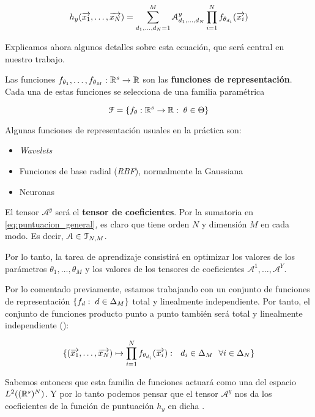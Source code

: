 \begin{equation} \label{eq:puntuacion_general}
    h_y(\overrightarrow{x_1}, \ldots, \overrightarrow{x_N}) = \sum_{d_1, \ldots, d_N = 1}^{M} \mathcal{A}^y_{d_1, \ldots, d_N} \prod_{i = 1}^N f_{\theta_{d_i}}(\overrightarrow{x_i})
\end{equation}

Explicamos ahora algunos detalles sobre esta ecuación, que será central en nuestro trabajo.

Las funciones $f_{\theta_1}, \ldots, f_{\theta_M}: \mathbb{R}^s \to \mathbb{R}$ son las \textbf{funciones de representación}. Cada una de estas funciones se selecciona de una familia paramétrica

$$\mathcal{F} = \{ f_{\theta}: \mathbb{R}^s \to \mathbb{R}: \; \theta \in \Theta \}$$

Algunas funciones de representación usuales en la práctica son:

\begin{itemize}
    \item \textit{Wavelets}
    \item Funciones de base radial (\textit{RBF}), normalmente la Gaussiana
    \item Neuronas
\end{itemize}

El tensor $\mathcal{A}^y$ será el \textbf{tensor de coeficientes}. Por la sumatoria en \eqref{eq:puntuacion_general}, es claro que tiene orden $N$ y dimensión $M$ en cada modo. Es decir, $\mathcal{A} \in \mathcal{T}_{N, M}$.

Por lo tanto, la tarea de aprendizaje consistirá en optimizar los valores de los parámetros $\theta_1, \ldots, \theta_M$ y los valores de los tensores de coeficientes $\mathcal{A}^1, \ldots, \mathcal{A}^Y$.

\begin{observacion}
    Por lo comentado previamente, estamos trabajando con un conjunto de funciones de representación $\{ f_d: \; d \in \Delta_{M} \}$ total y linealmente independiente. Por tanto, el conjunto de funciones producto punto a punto también será total y linealmente independiente ():

    \begin{equation}
        \{ (\overrightarrow{x_1}, \ldots, \overrightarrow{x_N}) \mapsto \prod_{i = 1}^{N} f_{\theta_{d_i}} (\overrightarrow{x_i}): \ \  d_i \in \Delta_{M} \ \  \forall i \in \Delta_{N}  \}
    \end{equation}


    Sabemos entonces que esta familia de funciones actuará como una  del espacio $L^2((\mathbb{R}^s)^N)$. Y por lo tanto podemos pensar que el tensor $\mathcal{A}^y$ nos da los coeficientes de la función de puntuación $h_y$ en dicha .
\end{observacion}


